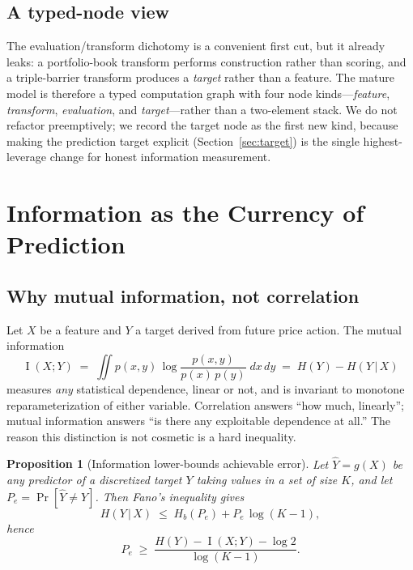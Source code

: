 \documentclass[11pt,a4paper]{article}
\theoremstyle{definition}
\theoremstyle{plain}
\newtheorem{proposition}{Proposition}[section]
\newcommand{\given}{\,\vert\,}
\DeclareMathOperator{\MI}{I}
\begin{document}
\subsection{A typed-node view}

The evaluation/transform dichotomy is a convenient first cut, but it already leaks: a portfolio-book
transform performs construction rather than scoring, and a triple-barrier transform produces a
\emph{target} rather than a feature. The mature model is therefore a typed computation graph with
four node kinds---\emph{feature}, \emph{transform}, \emph{evaluation}, and \emph{target}---rather
than a two-element stack. We do not refactor preemptively; we record the target node as the first
new kind, because making the prediction target explicit (Section~\ref{sec:target}) is the single
highest-leverage change for honest information measurement.

\section{Information as the Currency of Prediction}
\label{sec:info}

\subsection{Why mutual information, not correlation}

Let $X$ be a feature and $Y$ a target derived from future price action. The mutual information
\[
   \MI(X;Y) \;=\; \iint p(x,y)\,\log\frac{p(x,y)}{p(x)\,p(y)}\;dx\,dy
   \;=\; H(Y) - H(Y\given X)
\]
measures \emph{any} statistical dependence, linear or not, and is invariant to monotone
reparameterization of either variable. Correlation answers ``how much, linearly''; mutual
information answers ``is there any exploitable dependence at all.'' The reason this distinction is
not cosmetic is a hard inequality.

\begin{proposition}[Information lower-bounds achievable error]
\label{prop:fano}
Let $\widehat{Y}=g(X)$ be any predictor of a discretized target $Y$ taking values in a set of size
$K$, and let $P_e=\Pr[\widehat{Y}\neq Y]$. Then Fano's inequality gives
\[
   H(Y\given X) \;\le\; H_b(P_e) + P_e\,\log(K-1),
\]
hence
\[
   P_e \;\ge\; \frac{H(Y) - \MI(X;Y) - \log 2}{\log(K-1)} .
\]
\end{proposition}
\end{document}
